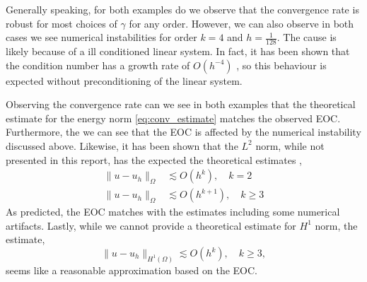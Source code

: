 Generally speaking, for both examples do we observe that the convergence rate is robust for most choices of $\gamma$ for any order. However, we can also observe in both cases we see numerical instabilities for order $k=4$ and $h=\frac{1}{128}$. The cause is
likely because of a ill conditioned linear system. In fact, it has been shown that the condition number has a growth rate of $O\left( h^{-4} \right) $ \cite{li07}, so this behaviour is expected without preconditioning of the linear system.

Observing the convergence rate can we see in both examples that the theoretical estimate for the energy norm \eqref{eq:conv_estimate} matches the observed EOC.
Furthermore, the we can see that the EOC is affected
by the numerical instability discussed above. Likewise, it has been shown that the $L^{2}$ norm, while not presented in this report, has the expected the theoretical estimates \cite{engel02}, \[
    \begin{split}
\| u - u_{h} \|_{ \Omega  }^{  } & \lesssim O\left( h^{k} \right) , \quad k = 2 \\
\| u - u_{h} \|_{ \Omega  }^{  }&  \lesssim O\left( h^{k+1} \right) , \quad k\ge  3
    \end{split}
\]
As predicted, the EOC matches with the estimates including some numerical artifacts.
Lastly, while we cannot provide a theoretical estimate for $H^{1}$ norm, the estimate, \[
\| u -u_{h} \|_{  H^{1}\left( \Omega  \right)  }^{  }   \lesssim O\left( h^{k} \right), \quad  k\ge 3 ,
\]
seems like a reasonable approximation based on the EOC.







